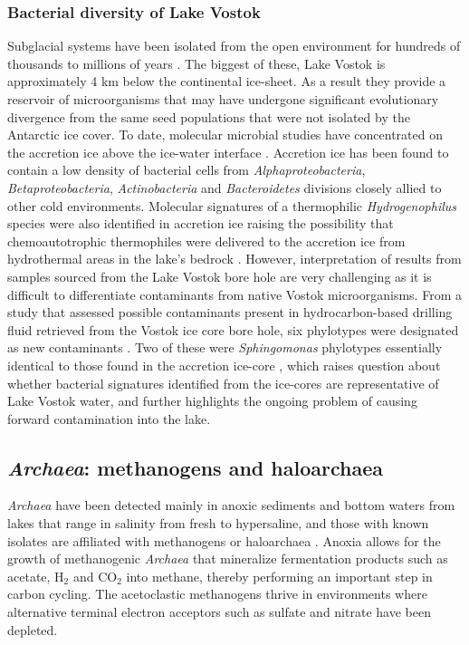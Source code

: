 \subsubsection{Bacterial diversity of Lake Vostok}
Subglacial systems have been isolated from the open environment for hundreds of thousands to millions of years \cite{Siegert2001}.
The biggest of these, Lake Vostok is approximately 4 km below the continental ice-sheet.
As a result they provide a reservoir of microorganisms that may have undergone significant evolutionary divergence from the same seed populations that were not isolated by the Antarctic ice cover. 
To date, molecular microbial studies have concentrated on the accretion ice above the ice-water interface \cite{Priscu1999, Christner2001}.
Accretion ice has been found to contain a low density of bacterial cells from \emph{Alphaproteobacteria}, \emph{Betaproteobacteria}, \emph{Actinobacteria} and \emph{Bacteroidetes} divisions closely allied to other cold environments.
Molecular signatures of a thermophilic \emph{Hydrogenophilus} species were also identified in accretion ice 
raising the possibility that chemoautotrophic thermophiles were delivered to the accretion ice from hydrothermal areas in the lake’s bedrock \cite{Bulat2004, Lavire2006}.
However, interpretation of results from samples sourced from the Lake Vostok bore hole are very challenging as it is difficult to differentiate contaminants from native Vostok microorganisms.
From a study that assessed possible contaminants present in hydrocarbon-based drilling fluid retrieved from the Vostok ice core bore hole, 
six phylotypes were designated as new contaminants \cite{Alekhina2007}. 
Two of these were \emph{Sphingomonas} phylotypes essentially identical to those found in the accretion ice-core \cite{Christner2001},
 which raises question about whether bacterial signatures identified from the ice-cores are representative of Lake Vostok water,
 and further highlights the ongoing problem of causing forward contamination into the lake.

\subsection{\emph{Archaea}: methanogens and haloarchaea}
\emph{Archaea} have been detected mainly in anoxic sediments and bottom waters from lakes that range in salinity from fresh to hypersaline, 
and those with known isolates are affiliated with methanogens or haloarchaea \cite{Bowman2000a, Bowman2000b, Purdy2003, Kurosawa2010, Lauro2011}.
Anoxia allows for the growth of methanogenic \emph{Archaea} that mineralize fermentation products such as acetate, H$_2$ and CO$_2$ into methane, thereby performing an important step in carbon cycling.
The acetoclastic methanogens thrive in environments where alternative terminal electron acceptors such as sulfate and nitrate have been depleted. 

